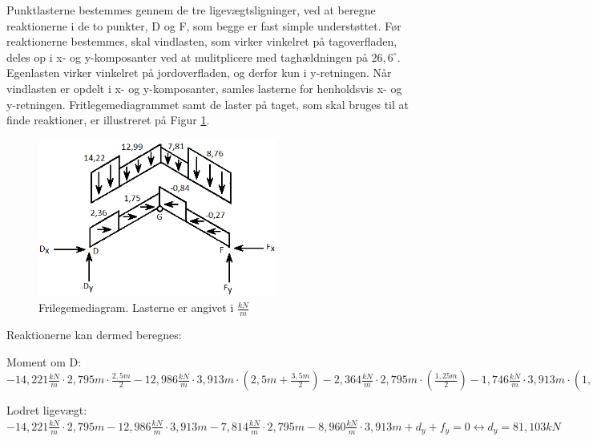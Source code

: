 Punktlasterne bestemmes gennem de tre ligevægtsligninger, ved at beregne reaktionerne i de to punkter, D og F, som begge er fast simple understøttet. Før reaktionerne bestemmes, skal vindlasten, som virker vinkelret på tagoverfladen, deles op i x- og y-komposanter ved at mulitplicere med taghældningen på $26,\!6^\circ$. Egenlasten virker vinkelret på jordoverfladen, og derfor kun i y-retningen. Når vindlasten er opdelt i x- og y-komposanter, samles lasterne for henholdsvis x- og y-retningen. Fritlegemediagrammet samt de laster på taget, som skal bruges til at finde reaktioner, er illustreret på Figur \ref{fig:fld}. 

\begin{figure}[htbp]
	\centering
	\includegraphics[width=0.7\textwidth]{billeder/fldtag.png}
	\caption{Frilegemediagram. Lasterne er angivet i $\frac{kN}{m}$}
	\label{fig:fld}
\end{figure}

Reaktionerne kan dermed beregnes:
\begin{center}
	Moment om D: $-14,\!221 \frac{kN}{m} \cdot 2,\!795 m \cdot \frac{2,\!5 m}{2} - 12,\!986 \frac{kN}{m} \cdot 3,\!913 m \cdot (2,\!5 m + \frac{3,\!5 m}{2}) - 2,\!364 \frac{kN}{m} \cdot 2,\!795 m \cdot (\frac{1,\!25 m}{2}) - 1,\!746 \frac{kN}{m} \cdot 3,\!913 m \cdot (1,\!25 m + \frac{1,\!75 m}{2}) - 7,\!814 \frac{kN}{m} \cdot 2,\!795 m \cdot (6 m + \frac{2,\!5 m}{2}) - 8,\!960 \frac{kN}{m} \cdot 3,\!913 m \cdot (8,\!5 m + \frac{3,\!5 m}{2}) - (-0,\!840 \frac{kN}{m}) \cdot 2,\!795 m \cdot (1,\!25 m + \frac{1,\!75 m}{2}) - (- 0,\!267 \frac{kN}{m}) \cdot 3,\!913 m \cdot (\frac{1,\!25 m}{2}) + 12 m \cdot f_y = 0 \leftrightarrow f_y = 66,\!366 kN$ 
\end{center}

\begin{center}
	Lodret ligevægt: $-14,\!221 \frac{kN}{m} \cdot 2,\!795 m - 12,\!986 \frac{kN}{m} \cdot 3,\!913 m - 7,\!814 \frac{kN}{m} \cdot 2,\!795 m -  8,\!960 \frac{kN}{m} \cdot 3,\!913 m + d_y + f_y = 0 \leftrightarrow d_y = 81,\!103 kN$
\end{center}

